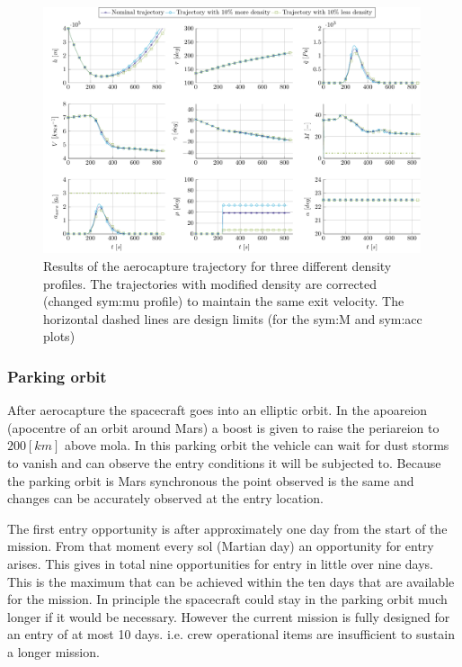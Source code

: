 \begin{figure}
	\centering
	\includegraphics[width=0.99\textwidth]{Figure/Orbit/sensitivity_aerocapture.pdf}
	\caption[Results of the aerocapture trajectory for three different density profiles]{Results of the aerocapture trajectory for three different density profiles. The trajectories with modified density are corrected (changed \gls{sym:mu} profile) to maintain the same exit velocity. The horizontal dashed lines are design limits (for the \gls{sym:M} and \gls{sym:acc} plots) }
	\label{fig:orbit_aerocapture_data}
\end{figure}

\subsubsection{Parking orbit}\label{sec:parking_orbit}
After aerocapture the spacecraft goes into an elliptic orbit. In the apoareion (apocentre of an orbit around Mars) a boost is given to raise the periareion to $200 \left[km\right]$ above \gls{mola}. In this parking orbit the vehicle can wait for dust storms to vanish and can observe the entry conditions it will be subjected to. Because the parking orbit is Mars synchronous the point observed is the same and changes can be accurately observed at the entry location. 

The first entry opportunity is after approximately one day from the start of the mission. From that moment every sol (Martian day) an opportunity for entry arises. This gives in total nine opportunities for entry in little over nine days. This is the maximum that can be achieved within the ten days that are available for the mission. In principle the spacecraft could stay in the parking orbit much longer if it would be necessary. However the current mission is fully designed for an entry of at most 10 days. i.e. crew operational items are insufficient to sustain a longer mission.

